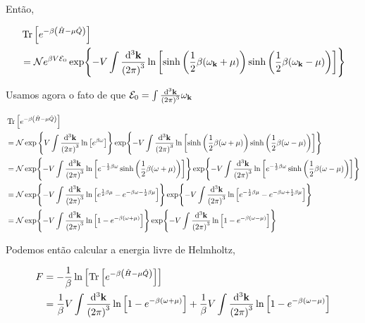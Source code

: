 \documentclass[twoside]{amsart}
\numberwithin{equation}{section}
\begin{document}
Então,

\begin{align}
    &\Tr\qty[e^{-\beta\qty(\hat H-\mu\hat Q)}]\\
    &=\mathcal Ne^{\beta V\mathcal E_0}\exp{-V\int\frac{\dd[3]{\vb k}}{\qty(2\pi)^3}\ln\qty[\sinh\qty(\frac12\beta\qty(\omega_{\vb k}+\mu))\sinh\qty(\frac12\beta\qty(\omega_{\vb k}-\mu))]}
\end{align}

Usamos agora o fato de que $\mathcal E_0=\int\frac{\dd[3]{\vb k}}{\qty(2\pi)^3}\omega_{\vb k}$

\begin{align}
    &\Tr\qty[e^{-\beta\qty(\hat H-\mu\hat Q)}]\\
    &=\mathcal N\exp\qty{V\int\frac{\dd[3]{\vb k}}{\qty(2\pi)^3}\ln\qty[e^{\beta\omega}]}\exp{-V\int\frac{\dd[3]{\vb k}}{\qty(2\pi)^3}\ln\qty[\sinh\qty(\frac12\beta\qty(\omega+\mu))\sinh\qty(\frac12\beta\qty(\omega-\mu))]}\\
    &=\mathcal N\exp{-V\int\frac{\dd[3]{\vb k}}{\qty(2\pi)^3}\ln\qty[e^{-\frac12\beta\omega}\sinh\qty(\frac12\beta\qty(\omega+\mu))]}\exp{-V\int\frac{\dd[3]{\vb k}}{\qty(2\pi)^3}\ln\qty[e^{-\frac12\beta\omega}\sinh\qty(\frac12\beta\qty(\omega-\mu))]}\\
    &=\mathcal N\exp{-V\int\frac{\dd[3]{\vb k}}{\qty(2\pi)^3}\ln\qty[e^{\frac12\beta\mu}-e^{-\beta\omega-\frac12\beta\mu}]}\exp{-V\int\frac{\dd[3]{\vb k}}{\qty(2\pi)^3}\ln\qty[e^{-\frac12\beta\mu}-e^{-\beta\omega+\frac12\beta\mu}]}\\
    &=\mathcal N\exp{-V\int\frac{\dd[3]{\vb k}}{\qty(2\pi)^3}\ln\qty[1-e^{-\beta\qty(\omega+\mu)}]}\exp{-V\int\frac{\dd[3]{\vb k}}{\qty(2\pi)^3}\ln\qty[1-e^{-\beta\qty(\omega-\mu)}]}
\end{align}

Podemos então calcular a energia livre de Helmholtz,

\begin{align}
    F&=-\frac1\beta\ln\qty[\Tr\qty[e^{-\beta\qty(\hat H-\mu\hat Q)}]]\\
    &=\frac1\beta V\int\frac{\dd[3]{\vb k}}{\qty(2\pi)^3}\ln\qty[1-e^{-\beta\qty(\omega+\mu)}]+\frac1\beta V\int\frac{\dd[3]{\vb k}}{\qty(2\pi)^3}\ln\qty[1-e^{-\beta\qty(\omega-\mu)}]
\end{align}


\end{document}
